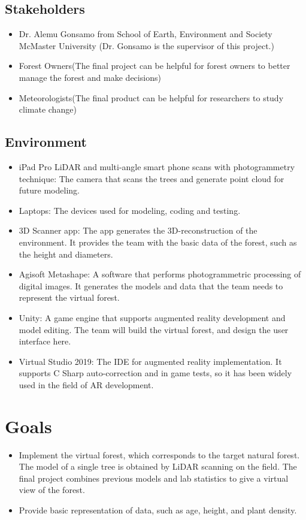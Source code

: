 \documentclass{article}
\begin{document}
\subsection{Stakeholders}
\begin{itemize}
    \item Dr. Alemu Gonsamo from School of Earth, Environment and Society McMaster University (Dr. Gonsamo is the supervisor of this project.)
    \item Forest Owners(The final project can be helpful for forest owners to better manage the 
    forest and make decisions)
    \item Meteorologists(The final product can be helpful for researchers to 
    study climate change)
\end{itemize}
\subsection{Environment}
\begin{itemize}
    \item iPad Pro LiDAR and multi-angle smart phone scans with photogrammetry technique: The camera that scans the trees and generate point cloud for future modeling.
    \item Laptops: The devices used for modeling, coding and testing.
    \item 3D Scanner app: The app generates the 3D-reconstruction of the environment. It provides the team with the basic data of the forest, such as the height and diameters.
    \item Agisoft Metashape: A software that performs photogrammetric processing of digital images. It generates the models and data that the team needs to represent the virtual forest.
    \item Unity: A game engine that supports augmented reality development and model editing. The team will build the virtual forest, and design the user interface here.
    \item Virtual Studio 2019: The IDE for augmented reality implementation. It supports C Sharp auto-correction and in game tests, so it has been widely used in the field of AR development.
    
\end{itemize}

\section{Goals}
\begin{itemize}
    \item Implement the virtual forest, which corresponds to the target natural forest. The model of a single tree is obtained by LiDAR scanning on the field. The final project combines previous models and lab statistics to give a virtual view of the forest. 
    \item Provide basic representation of data, such as age, height, and plant density. 
\end{itemize}
\end{document}
